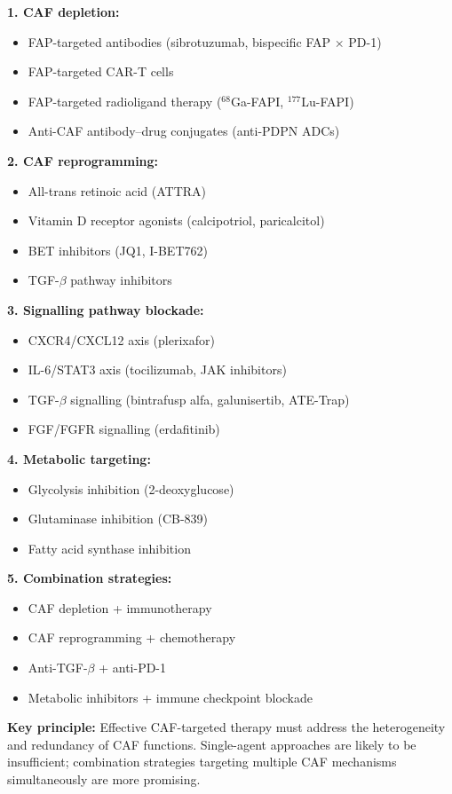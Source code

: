 \begin{tcolorbox}[title=Box 2: Therapeutic strategies targeting CAFs in breast cancer]

\textbf{1. CAF depletion:}
\begin{itemize}
  \item FAP-targeted antibodies (sibrotuzumab, bispecific FAP $\times$ PD-1)
  \item FAP-targeted CAR-T cells
  \item FAP-targeted radioligand therapy ($^{68}$Ga-FAPI, $^{177}$Lu-FAPI)
  \item Anti-CAF antibody--drug conjugates (anti-PDPN ADCs)
\end{itemize}

\textbf{2. CAF reprogramming:}
\begin{itemize}
  \item All-trans retinoic acid (ATTRA)
  \item Vitamin D receptor agonists (calcipotriol, paricalcitol)
  \item BET inhibitors (JQ1, I-BET762)
  \item TGF-$\beta$ pathway inhibitors
\end{itemize}

\textbf{3. Signalling pathway blockade:}
\begin{itemize}
  \item CXCR4/CXCL12 axis (plerixafor)
  \item IL-6/STAT3 axis (tocilizumab, JAK inhibitors)
  \item TGF-$\beta$ signalling (bintrafusp alfa, galunisertib, ATE-Trap)
  \item FGF/FGFR signalling (erdafitinib)
\end{itemize}

\textbf{4. Metabolic targeting:}
\begin{itemize}
  \item Glycolysis inhibition (2-deoxyglucose)
  \item Glutaminase inhibition (CB-839)
  \item Fatty acid synthase inhibition
\end{itemize}

\textbf{5. Combination strategies:}
\begin{itemize}
  \item CAF depletion + immunotherapy
  \item CAF reprogramming + chemotherapy
  \item Anti-TGF-$\beta$ + anti-PD-1
  \item Metabolic inhibitors + immune checkpoint blockade
\end{itemize}

\textbf{Key principle:} Effective CAF-targeted therapy must address the heterogeneity and redundancy of CAF functions. Single-agent approaches are likely to be insufficient; combination strategies targeting multiple CAF mechanisms simultaneously are more promising.

\end{tcolorbox}
